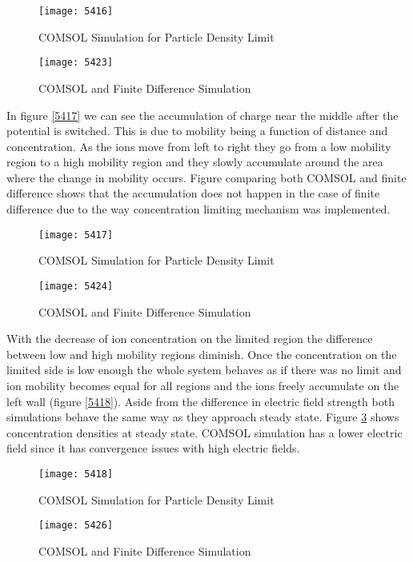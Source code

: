 \begin{figure}[ht]
\centering
\begin{minipage}[b]{0.45\linewidth}
\texttt{[image: 5416]}
\caption{COMSOL Simulation for Particle Density Limit}
\label{5416}
\end{minipage}
\quad
\begin{minipage}[b]{0.45\linewidth}
\texttt{[image: 5423]}
\caption{COMSOL and Finite Difference Simulation}
\label{5423}
\end{minipage}
\end{figure}


In figure \ref{5417} we can see the accumulation of charge near the middle after the potential is switched. This is due to mobility being a function of distance and concentration. As the ions move from left to right they go from a low mobility region to a high mobility region and they slowly accumulate around the area where the change in mobility occurs. Figure comparing both COMSOL and finite difference shows that the accumulation does not happen in the case of finite difference due to the way concentration limiting mechanism was implemented.

\begin{figure}[ht]
\centering
\begin{minipage}[b]{0.45\linewidth}
\texttt{[image: 5417]}
\caption{COMSOL Simulation for Particle Density Limit}
\label{5417}
\end{minipage}
\quad
\begin{minipage}[b]{0.45\linewidth}
\texttt{[image: 5424]}
\caption{COMSOL and Finite Difference Simulation}
\label{5424}
\end{minipage}
\end{figure}

With the decrease of ion concentration on the limited region the difference between low and high mobility regions diminish. Once the concentration on the limited side is low enough the whole system behaves as if there was no limit and ion mobility becomes equal for all regions and the ions freely accumulate on the left wall (figure \ref{5418}). Aside from the difference in electric field strength both simulations behave the same way as they approach steady state. Figure \ref{5426} shows concentration densities at steady state. COMSOL simulation has a lower electric field since it has convergence issues with high electric fields. 

\begin{figure}[ht]
\centering
\begin{minipage}[b]{0.45\linewidth}
\texttt{[image: 5418]}
\caption{COMSOL Simulation for Particle Density Limit}
\label{5418}
\end{minipage}
\quad
\begin{minipage}[b]{0.45\linewidth}
\texttt{[image: 5426]}
\caption{COMSOL and Finite Difference Simulation}
\label{5426}
\end{minipage}
\end{figure}

